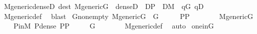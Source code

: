 \begin{isabellebody}
\endisatagproof
{\isafoldproof}%
%
\isadelimproof
\isanewline
%
\endisadelimproof
\isanewline
{}\isamarkupfalse%
\ M{\isacharunderscore}{\kern0pt}generic{\isacharunderscore}{\kern0pt}denseD\ {\isacharbrackleft}{\kern0pt}dest{\isacharbrackright}{\kern0pt}{\isacharcolon}{\kern0pt}\ {\isachardoublequoteopen}M{\isacharunderscore}{\kern0pt}generic{\isacharparenleft}{\kern0pt}G{\isacharparenright}{\kern0pt}\ {\isasymLongrightarrow}\ dense{\isacharparenleft}{\kern0pt}D{\isacharparenright}{\kern0pt}\ {\isasymLongrightarrow}\ D{\isasymsubseteq}P\ {\isasymLongrightarrow}\ D{\isasymin}M\ {\isasymLongrightarrow}\ {\isasymexists}q{\isasymin}G{\isachardot}{\kern0pt}\ q{\isasymin}D{\isachardoublequoteclose}\isanewline
%
\isadelimproof
\ \ %
\endisadelimproof
%
\isatagproof
{}\isamarkupfalse%
\ M{\isacharunderscore}{\kern0pt}generic{\isacharunderscore}{\kern0pt}def\ \isamarkupfalse%
\ blast%
\endisatagproof
{\isafoldproof}%
%
\isadelimproof
\isanewline
%
\endisadelimproof
\isanewline
{}\isamarkupfalse%
\ G{\isacharunderscore}{\kern0pt}nonempty{\isacharcolon}{\kern0pt}\ {\isachardoublequoteopen}M{\isacharunderscore}{\kern0pt}generic{\isacharparenleft}{\kern0pt}G{\isacharparenright}{\kern0pt}\ {\isasymLongrightarrow}\ G{\isasymnoteq}{}{\isachardoublequoteclose}\isanewline
%
\isadelimproof
%
\endisadelimproof
%
\isatagproof
{}\isamarkupfalse%
\ {\isacharminus}{\kern0pt}\isanewline
\ \ \isamarkupfalse%
\ {\isachardoublequoteopen}P{\isasymsubseteq}P{\isachardoublequoteclose}\ \isacommand{{\isachardot}{\kern0pt}{\isachardot}{\kern0pt}}\isamarkupfalse%
\isanewline
\ \ \isamarkupfalse%
\isanewline
\ \ \ \ {\isachardoublequoteopen}M{\isacharunderscore}{\kern0pt}generic{\isacharparenleft}{\kern0pt}G{\isacharparenright}{\kern0pt}{\isachardoublequoteclose}\isanewline
\ \ \isamarkupfalse%
\ P{\isacharunderscore}{\kern0pt}in{\isacharunderscore}{\kern0pt}M\ P{\isacharunderscore}{\kern0pt}dense\ {\isacartoucheopen}P{\isasymsubseteq}P{\isacartoucheclose}\ \isamarkupfalse%
\isanewline
\ \ \ \ {\isachardoublequoteopen}G\ {\isasymnoteq}\ {}{\isachardoublequoteclose}\isanewline
\ \ \ \ \isamarkupfalse%
\ M{\isacharunderscore}{\kern0pt}generic{\isacharunderscore}{\kern0pt}def\ \isamarkupfalse%
\ auto\isanewline
{}\isamarkupfalse%
%
\endisatagproof
{\isafoldproof}%
%
\isadelimproof
\isanewline
%
\endisadelimproof
\isanewline
{}\isamarkupfalse%
\ one{\isacharunderscore}{\kern0pt}in{\isacharunderscore}{\kern0pt}G\ {\isacharcolon}{\kern0pt}\ \isanewline

\end{isabellebody}
